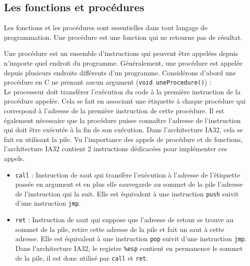 \subsection{Les fonctions et procédures}
Les fonctions et les procédures sont essentielles dans tout langage de programmation.
Une procédure est une fonction qui ne retourne pas de résultat.

Une procédure est un ensemble d'instructions qui peuvent être appelées depuis n'importe quel endroit du programme.
Généralement, une procédure est appelée depuis plusieurs endroits différents d'un programme.
Considérons d'abord une procédure en C ne prenant aucun argument (\texttt{void uneProcedure()}) : \\
Le processeur doit transférer l'exécution du code à la première instruction de la procédure appelée.
Cela se fait en associant une étiquette à chaque procédure qui correspond à l'adresse de la première instruction de cette procédure.
Il est également nécessaire que la procédure puisse connaître l'adresse de l'instruction qui doit être exécutée à la fin de son exécution.
Dans l'architecture IA32, cela se fait en utilisant la pile.
Vu l'importance des appels de procédure et de fonctions, l'architecture IA32 contient 2 instructions dédicacées pour implémenter ces appels.
\begin{itemize}
  \item \texttt{call} : Instruction de saut qui transfère l'exécution à l'adresse de l'étiquette passée en argument et en plus elle sauvegarde au sommet de la pile l'adresse de l'instruction qui la suit.
    Elle est équivalent à une instruction \texttt{push} suivit d'une instruction \texttt{jmp}.
  \item \texttt{ret} : Instruction de saut qui suppose que l'adresse de retour se trouve au sommet de la pile, retire cette adresse de la pile et fait un saut à cette adresse.
    Elle est équivalent à une instruction \texttt{pop} suivit d'une instruction \texttt{jmp}.
    Dans l'architecture IA32, le registre \texttt{\%esp} contient en permanence le sommet de la pile, il est donc utilisé par \texttt{call} et \texttt{ret}.
\end{itemize}

